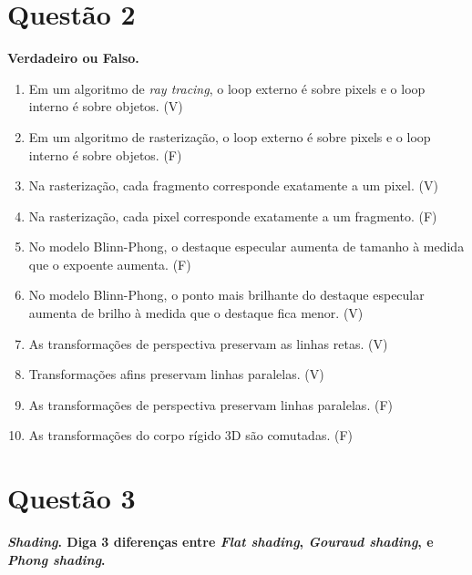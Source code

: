 \documentclass[12pt]{exam}
\newcommand{\true}{V}
\newcommand{\false}{F}
\begin{document}
\section*{Questão 2}
{\bfseries Verdadeiro ou Falso.}

\begin{enumerate}[label=\alph*)]
    \item Em um algoritmo de \textit{ray tracing}, o loop externo é sobre pixels e o loop interno é sobre objetos. (\true)
    \item Em um algoritmo de rasterização, o loop externo é sobre pixels e o loop interno é sobre objetos. (\false)
    \item Na rasterização, cada fragmento corresponde exatamente a um pixel. (\true)
    \item Na rasterização, cada pixel corresponde exatamente a um fragmento. (\false)
    \item No modelo Blinn-Phong, o destaque especular aumenta de tamanho à medida que o expoente aumenta. (\false)
    \item No modelo Blinn-Phong, o ponto mais brilhante do destaque especular aumenta de brilho à medida que o destaque fica menor. (\true)
    \item As transformações de perspectiva preservam as linhas retas. (\true)
    \item Transformações afins preservam linhas paralelas. (\true)
    \item As transformações de perspectiva preservam linhas paralelas. (\false)
    \item As transformações do corpo rígido 3D são comutadas. (\false)
\end{enumerate}

\section*{Questão 3}
{\bfseries \textit{Shading}. Diga 3 diferenças entre \textit{Flat shading}, \textit{Gouraud shading}, e \textit{Phong shading}.}
\end{document}
